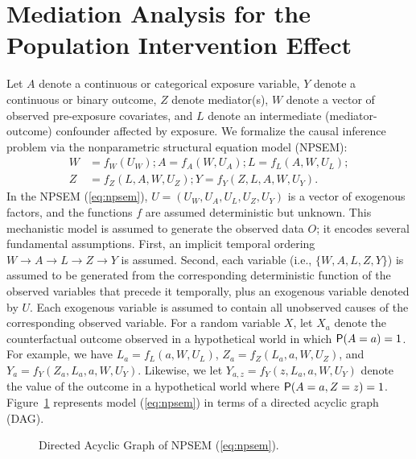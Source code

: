 \section{Mediation Analysis for the Population Intervention
  Effect}\label{sec:backg}
Let $A$ denote a continuous or categorical exposure variable, $Y$ denote
a continuous or binary outcome, $Z$ denote mediator(s), $W$ denote
a vector of observed pre-exposure covariates, and $L$ denote an
intermediate (mediator-outcome) confounder affected by exposure. We formalize
the causal inference problem via the nonparametric structural
equation model (NPSEM):
\begin{align}\label{eq:npsem}
  W &= f_W(U_W); A = f_A(W, U_A); L = f_L(A, W, U_L);\\ \nonumber
  Z &= f_Z(L, A, W, U_Z); Y = f_Y(Z, L, A, W, U_Y).
\end{align}
In the NPSEM (\ref{eq:npsem}), $U=(U_W,U_A,U_L,U_Z,U_Y)$ is a vector of
exogenous factors, and the functions $f$ are assumed deterministic but unknown.
This mechanistic model is assumed to generate the observed data $O$; it encodes
several fundamental assumptions. First, an implicit temporal ordering $W
\rightarrow A \rightarrow L \rightarrow Z \rightarrow Y$ is assumed. Second,
each variable (i.e., $\{W, A, L, Z, Y\}$) is assumed to be generated from the
corresponding deterministic function of the observed variables that precede it
temporally, plus an exogenous variable denoted by $U$. Each exogenous variable
is assumed to contain all unobserved causes of the corresponding observed
variable. For a random variable $X$, let $X_a$ denote the counterfactual outcome
observed in a hypothetical world in which $\P(A=a)=1$. For example, we have
$L_a = f_L(a, W,U_L)$, $Z_a=f_Z(L_a, a, W,U_Z)$, and $Y_a=f_Y(Z_a, L_a, a, W,
U_Y)$. Likewise, we let $Y_{a,z} = f_Y(z, L_a, a, W,U_Y)$ denote the value of
the outcome in a hypothetical world where $\P(A = a, Z = z)=1$.
Figure~\ref{fig:dag} represents model (\ref{eq:npsem}) in terms of a directed
acyclic graph (DAG).
\begin{figure}[!htb]
  \centering
  \caption{Directed Acyclic Graph of NPSEM (\ref{eq:npsem}).}
  \label{fig:dag}
\end{figure}

